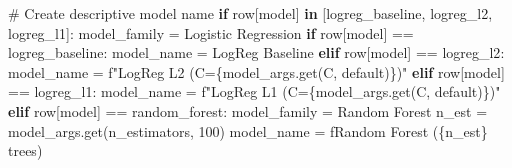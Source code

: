 \documentclass[
  letterpaper,
  DIV=11,
  numbers=noendperiod]{scrartcl}
\newenvironment{Shaded}{\begin{snugshade}}{\end{snugshade}}
\newcommand{\CommentTok}[1]{\textcolor[rgb]{0.37,0.37,0.37}{#1}}
\newcommand{\ControlFlowTok}[1]{\textcolor[rgb]{0.00,0.23,0.31}{\textbf{#1}}}
\newcommand{\DecValTok}[1]{\textcolor[rgb]{0.68,0.00,0.00}{#1}}
\newcommand{\KeywordTok}[1]{\textcolor[rgb]{0.00,0.23,0.31}{\textbf{#1}}}
\newcommand{\NormalTok}[1]{\textcolor[rgb]{0.00,0.23,0.31}{#1}}
\newcommand{\OperatorTok}[1]{\textcolor[rgb]{0.37,0.37,0.37}{#1}}
\newcommand{\SpecialCharTok}[1]{\textcolor[rgb]{0.37,0.37,0.37}{#1}}
\newcommand{\SpecialStringTok}[1]{\textcolor[rgb]{0.13,0.47,0.30}{#1}}
\newcommand{\StringTok}[1]{\textcolor[rgb]{0.13,0.47,0.30}{#1}}
\renewenvironment{Shaded}{%
  \begin{tcolorbox}[%
    enhanced,%
    colback=codebg,%
    colframe=codebg,%
    borderline west={3pt}{0pt}{sectionblue},%
    fontupper=\small\ttfamily,%
    boxrule=0pt,%
    arc=0pt,%
    boxsep=5pt,%
    left=2mm,%
    right=2mm,%
    top=2mm,%
    bottom=2mm%
  ]%
}{%
  \end{tcolorbox}%
}
\begin{document}
\begin{Shaded}
\begin{Highlighting}[]
    \CommentTok{\# Create descriptive model name}
    \ControlFlowTok{if}\NormalTok{ row[}\StringTok{\textquotesingle{}model\textquotesingle{}}\NormalTok{] }\KeywordTok{in}\NormalTok{ [}\StringTok{\textquotesingle{}logreg\_baseline\textquotesingle{}}\NormalTok{, }\StringTok{\textquotesingle{}logreg\_l2\textquotesingle{}}\NormalTok{, }\StringTok{\textquotesingle{}logreg\_l1\textquotesingle{}}\NormalTok{]:}
\NormalTok{        model\_family }\OperatorTok{=} \StringTok{\textquotesingle{}Logistic Regression\textquotesingle{}}
        \ControlFlowTok{if}\NormalTok{ row[}\StringTok{\textquotesingle{}model\textquotesingle{}}\NormalTok{] }\OperatorTok{==} \StringTok{\textquotesingle{}logreg\_baseline\textquotesingle{}}\NormalTok{:}
\NormalTok{            model\_name }\OperatorTok{=} \StringTok{\textquotesingle{}LogReg Baseline\textquotesingle{}}
        \ControlFlowTok{elif}\NormalTok{ row[}\StringTok{\textquotesingle{}model\textquotesingle{}}\NormalTok{] }\OperatorTok{==} \StringTok{\textquotesingle{}logreg\_l2\textquotesingle{}}\NormalTok{:}
\NormalTok{            model\_name }\OperatorTok{=} \SpecialStringTok{f"LogReg L2 (C=}\SpecialCharTok{\{}\NormalTok{model\_args}\SpecialCharTok{.}\NormalTok{get(}\StringTok{\textquotesingle{}C\textquotesingle{}}\NormalTok{, }\StringTok{\textquotesingle{}default\textquotesingle{}}\NormalTok{)}\SpecialCharTok{\}}\SpecialStringTok{)"}
        \ControlFlowTok{elif}\NormalTok{ row[}\StringTok{\textquotesingle{}model\textquotesingle{}}\NormalTok{] }\OperatorTok{==} \StringTok{\textquotesingle{}logreg\_l1\textquotesingle{}}\NormalTok{:}
\NormalTok{            model\_name }\OperatorTok{=} \SpecialStringTok{f"LogReg L1 (C=}\SpecialCharTok{\{}\NormalTok{model\_args}\SpecialCharTok{.}\NormalTok{get(}\StringTok{\textquotesingle{}C\textquotesingle{}}\NormalTok{, }\StringTok{\textquotesingle{}default\textquotesingle{}}\NormalTok{)}\SpecialCharTok{\}}\SpecialStringTok{)"}
    \ControlFlowTok{elif}\NormalTok{ row[}\StringTok{\textquotesingle{}model\textquotesingle{}}\NormalTok{] }\OperatorTok{==} \StringTok{\textquotesingle{}random\_forest\textquotesingle{}}\NormalTok{:}
\NormalTok{        model\_family }\OperatorTok{=} \StringTok{\textquotesingle{}Random Forest\textquotesingle{}}
\NormalTok{        n\_est }\OperatorTok{=}\NormalTok{ model\_args.get(}\StringTok{\textquotesingle{}n\_estimators\textquotesingle{}}\NormalTok{, }\DecValTok{100}\NormalTok{)}
\NormalTok{        model\_name }\OperatorTok{=} \SpecialStringTok{f\textquotesingle{}Random Forest (}\SpecialCharTok{\{}\NormalTok{n\_est}\SpecialCharTok{\}}\SpecialStringTok{ trees)\textquotesingle{}}

\end{Highlighting}
\end{Shaded}
\end{document}

